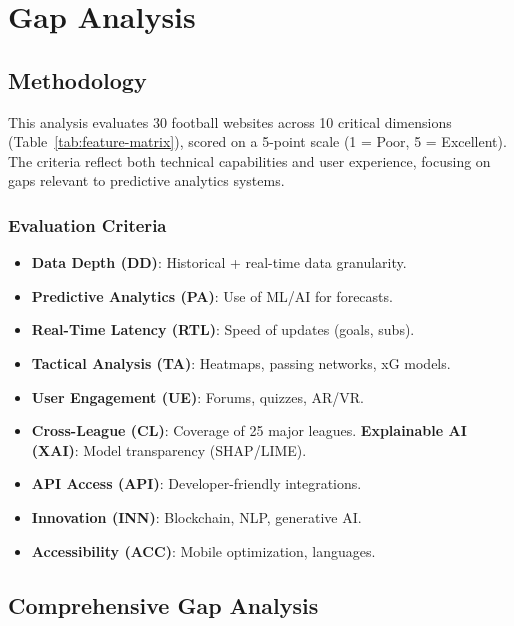 \chapter{Gap Analysis}
\label{chap:gap-analysis}

\section{Methodology}
This analysis evaluates 30 football websites across 10 critical dimensions (Table~\ref{tab:feature-matrix}), scored on a 5-point scale (1 = Poor, 5 = Excellent). The criteria reflect both technical capabilities and user experience, focusing on gaps relevant to predictive analytics systems.

\subsection{Evaluation Criteria}
\begin{itemize}
    \item \textbf{Data Depth (DD)}: Historical + real-time data granularity.
    \item \textbf{Predictive Analytics (PA)}: Use of ML/AI for forecasts.
    \item \textbf{Real-Time Latency (RTL)}: Speed of updates (goals, subs).
    \item \textbf{Tactical Analysis (TA)}: Heatmaps, passing networks, xG models.
    \item \textbf{User Engagement (UE)}: Forums, quizzes, AR/VR.
    \item \textbf{Cross-League (CL)}: Coverage of 25 major leagues.
    \textbf{Explainable AI (XAI)}: Model transparency (SHAP/LIME).
    \item \textbf{API Access (API)}: Developer-friendly integrations.
    \item \textbf{Innovation (INN)}: Blockchain, NLP, generative AI.
    \item \textbf{Accessibility (ACC)}: Mobile optimization, languages.
\end{itemize}

\section{Comprehensive Gap Analysis}
